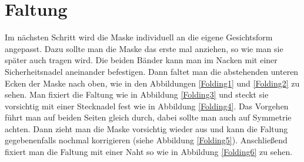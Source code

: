 \documentclass[12pt,parskip=full]{scrartcl}
\begin{document}
\section{Faltung}
Im nächsten Schritt wird die Maske individuell an die eigene Gesichtsform angepasst. Dazu sollte man die Maske das erste mal anziehen, so wie man sie später auch tragen wird. Die beiden Bänder kann man im Nacken mit einer Sicherheitsnadel aneinander befestigen. Dann faltet man die abstehenden unteren Ecken der Maske nach oben, wie in den Abbildungen \ref{Folding1} und \ref{Folding2} zu sehen. Man fixiert die Faltung wie in Abbildung \ref{Folding3} und steckt sie vorsichtig mit einer Stecknadel fest wie in Abbildung \ref{Folding4}. Das Vorgehen führt man auf beiden Seiten gleich durch, dabei sollte man auch auf Symmetrie achten. Dann zieht man die Maske vorsichtig wieder aus und kann die Faltung gegebenenfalls nochmal korrigieren (siehe Abbildung \ref{Folding5}). Anschließend fixiert man die Faltung mit einer Naht so wie in Abbildung \ref{Folding6} zu sehen. 
\end{document}
